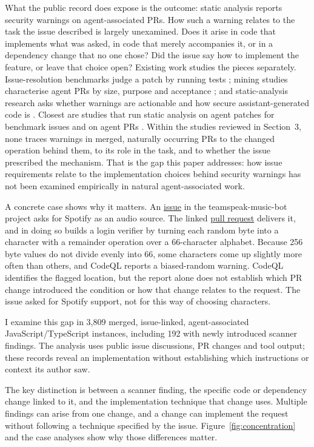 \documentclass[acmsmall,screen,nonacm]{acmart}
\begin{document}
What the public record does expose is the outcome: static analysis reports security warnings on agent-associated PRs. How such a warning relates to the task the issue described is largely unexamined. Does it arise in code that implements what was asked, in code that merely accompanies it, or in a dependency change that no one chose? Did the issue say how to implement the feature, or leave that choice open? Existing work studies the pieces separately. Issue-resolution benchmarks judge a patch by running tests \cite{b9}; mining studies characterise agent PRs by size, purpose and acceptance \cite{b11,b21}; and static-analysis research asks whether warnings are actionable and how secure assistant-generated code is \cite{b32,b33,b34,b35}. Closest are studies that run static analysis on agent patches for benchmark issues \cite{b36} and on agent PRs \cite{b37}. Within the studies reviewed in Section~3, none traces warnings in merged, naturally occurring PRs to the changed operation behind them, to its role in the task, and to whether the issue prescribed the mechanism. That is the gap this paper addresses: how issue requirements relate to the implementation choices behind security warnings has not been examined empirically in natural agent-associated work.

A concrete case shows why it matters. An \href{https://github.com/ZHANGTIANYAO1/teamspeak-music-bot/issues/112}{issue} in the teamspeak-music-bot project asks for Spotify as an audio source. The linked \href{https://github.com/ZHANGTIANYAO1/teamspeak-music-bot/pull/118}{pull request} delivers it, and in doing so builds a login verifier by turning each random byte into a character with a remainder operation over a 66-character alphabet. Because 256 byte values do not divide evenly into 66, some characters come up slightly more often than others, and CodeQL reports a biased-random warning. CodeQL identifies the flagged location, but the report alone does not establish which PR change introduced the condition or how that change relates to the request. The issue asked for Spotify support, not for this way of choosing characters.

I examine this gap in 3,809 merged, issue-linked, agent-associated JavaScript/\allowbreak TypeScript instances, including 192 with newly introduced scanner findings. The analysis uses public issue discussions, PR changes and tool output; these records reveal an implementation without establishing which instructions or context its author saw.

The key distinction is between a scanner finding, the specific code or dependency change linked to it, and the implementation technique that change uses. Multiple findings can arise from one change, and a change can implement the request without following a technique specified by the issue. Figure~\ref{fig:concentration} and the case analyses show why those differences matter.
\end{document}
